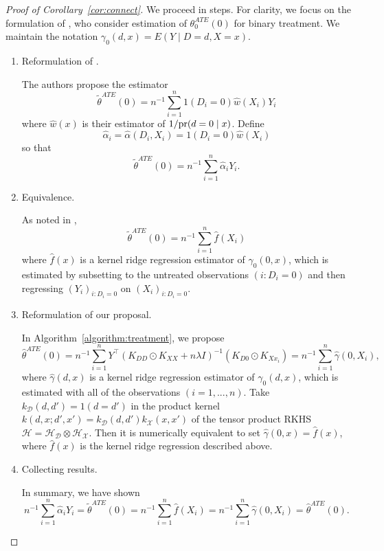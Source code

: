 \begin{proof}[Proof of Corollary~\ref{cor:connect}]
We proceed in steps. For clarity, we focus on the formulation of \cite{hirshberg2019minimax}, who consider estimation of $\theta_0^{ATE}(0)$ for binary treatment. We maintain the notation $\gamma_0(d,x)=E(Y \mid D=d,X=x)$.
\begin{enumerate}
    \item Reformulation of \cite{hirshberg2019minimax}. 
    
    The authors propose the estimator
$$
\tilde{\theta}^{ATE}(0)=n^{-1}\sum_{i=1}^n 1(D_i=0)\hat{w}(X_i) Y_i
$$
where $\hat{w}(x)$ is their estimator of $1/\text{\normalfont pr}(d=0 \mid x)$. Define
$$
\hat{\alpha}_i=\hat{\alpha}(D_i,X_i)=1(D_i=0)\hat{w}(X_i)
$$
so that 
$$
\tilde{\theta}^{ATE}(0)=n^{-1}\sum_{i=1}^n \hat{\alpha}_i Y_i.
$$

    \item Equivalence. 
    
    As noted in \cite[Lemma 1]{hirshberg2019minimax},
    $$
    \tilde{\theta}^{ATE}(0)=n^{-1}\sum_{i=1}^n\hat{f}(X_i)
    $$
    where $\hat{f}(x)$ is a kernel ridge regression estimator of $\gamma_0(0,x)$, which is estimated by subsetting to the untreated observations $(i:D_i=0)$ and then regressing $(Y_i)_{i:D_i=0}$ on $(X_i)_{i:D_i=0}$.
    
    \item Reformulation of our proposal.
    
    In Algorithm~\ref{algorithm:treatment}, we propose
    $$
    \hat{\theta}^{ATE}(0)=n^{-1}\sum_{i=1}^n Y^{\top}(K_{DD}\odot K_{XX}+n\lambda  I )^{-1}(K_{D0}\odot K_{Xx_i})=n^{-1}\sum_{i=1}^n \hat{\gamma}(0,X_i),
    $$
    where $\hat{\gamma}(d,x)$ is a kernel ridge regression estimator of $\gamma_0(d,x)$, which is estimated with all of the observations $(i=1,...,n)$. Take $k_{\mathcal{D}}(d,d')=1(d=d')$ in the product kernel $k(d,x;d',x')=k_{\mathcal{D}}(d,d')k_{\mathcal{X}}(x,x')$ of the tensor product RKHS $\mathcal{H}=\mathcal{H}_{\mathcal{D}}\otimes \mathcal{H}_{\mathcal{X}}$. Then it is numerically equivalent to set $\hat{\gamma}(0,x)=\hat{f}(x)$, where $\hat{f}(x)$ is the kernel ridge regression described above.
    
    \item Collecting results.
    
    In summary, we have shown
    $$
    n^{-1}\sum_{i=1}^n \hat{\alpha}_i Y_i=\tilde{\theta}^{ATE}(0)=n^{-1}\sum_{i=1}^n\hat{f}(X_i)=n^{-1}\sum_{i=1}^n \hat{\gamma}(0,X_i)=\hat{\theta}^{ATE}(0).
    $$
\end{enumerate}

\end{proof}


